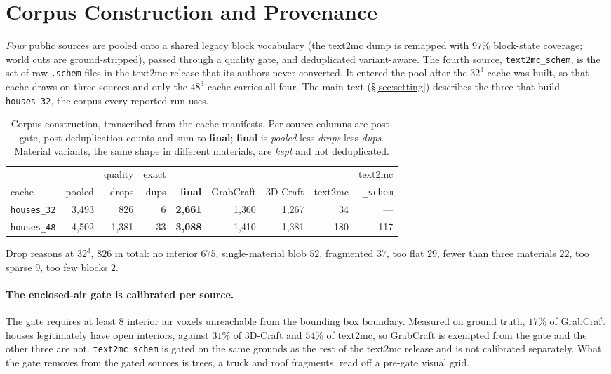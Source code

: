 \section{Corpus Construction and Provenance}
\label{app:corpus}

\emph{Four} public sources are pooled onto a shared legacy block vocabulary
(the text2mc dump is remapped with $97\%$ block-state coverage; world cuts are
ground-stripped), passed through a quality gate, and deduplicated variant-aware.
The fourth source, \texttt{text2mc\_schem}, is the set of raw \texttt{.schem}
files in the text2mc release that its authors never converted. It entered the
pool after the $32^3$ cache was built, so that cache draws on three sources and
only the $48^3$ cache carries all four. The main text (\S\ref{sec:setting}) describes the three that build
\texttt{houses\_32}, the corpus every reported run uses.

\begin{table}[h]
\centering
\small
\caption{Corpus construction, transcribed from the cache manifests. Per-source
columns are post-gate, post-deduplication counts and sum to \textbf{final};
\textbf{final} is \emph{pooled} less \emph{drops} less \emph{dups}. Material
variants, the same shape in different materials, are \emph{kept} and not
deduplicated.}
\setlength{\tabcolsep}{4pt}
\begin{tabular}{lrrrrrrrr}
\toprule
      &        & quality & exact  &                  &           &          &         & text2mc \\
cache & pooled & drops   & dups   & \textbf{final} & GrabCraft & 3D-Craft & text2mc & \texttt{\_schem} \\
\midrule
\texttt{houses\_32} & 3{,}493 & 826 & 6 & \textbf{2{,}661} & 1{,}360 & 1{,}267 & 34 & --- \\
\texttt{houses\_48} & 4{,}502 & 1{,}381 & 33 & \textbf{3{,}088} & 1{,}410 & 1{,}381 & 180 & 117 \\
\bottomrule
\end{tabular}
\end{table}

Drop reasons at $32^3$, $826$ in total: no interior $675$, single-material blob
$52$, fragmented $37$, too flat $29$, fewer than three materials $22$, too
sparse $9$, too few blocks $2$.

\paragraph{The enclosed-air gate is calibrated per source.}
The gate requires at least $8$ interior air voxels unreachable from the bounding
box boundary. Measured on ground truth, $17\%$ of GrabCraft houses legitimately
have open interiors, against $31\%$ of 3D-Craft and $54\%$ of text2mc, so
GrabCraft is exempted from the gate and the other three are not.
\texttt{text2mc\_schem} is gated on the same grounds as the rest of the text2mc
release and is not calibrated separately. What the gate removes from the gated
sources is trees, a truck and roof fragments, read off a pre-gate visual grid.

